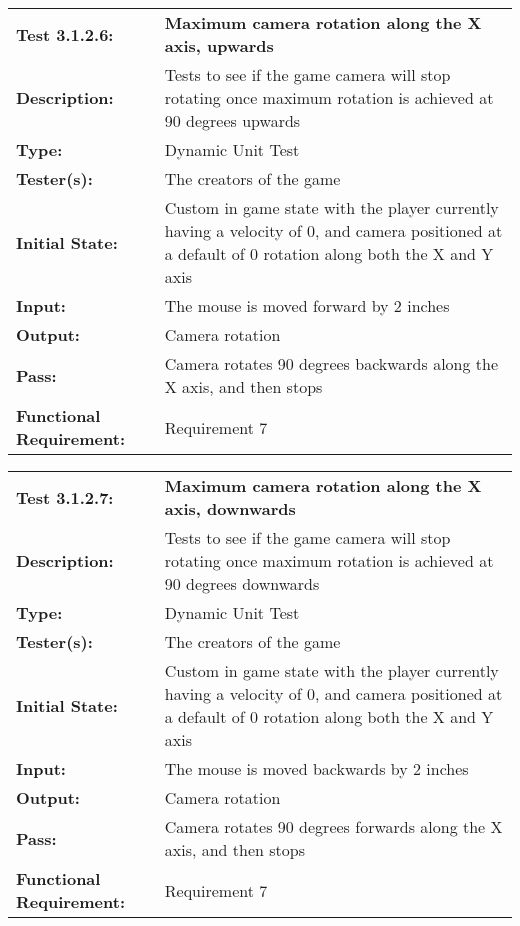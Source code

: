 \documentclass[12pt, titlepage]{article}
\begin{document}
\begin{mdframed}[linewidth=1pt]
\begin{tabularx}{\textwidth}{@{}p{3cm}X@{}}
{\bf Test 3.1.2.6:} & {\bf Maximum camera rotation along the X axis, upwards}\\[\baselineskip]
{\bf Description:} & Tests to see if the game camera will stop rotating once maximum rotation is achieved at 90 degrees upwards\\[0.5\baselineskip]
{\bf Type:} & Dynamic Unit Test\\[0.5\baselineskip]
{\bf Tester(s):} & The creators of the game\\[0.5\baselineskip]
{\bf Initial State:} & Custom in game state with the player currently having a velocity of 0, and camera positioned at a default of 0 rotation along both the X and Y axis\\[0.5\baselineskip]
{\bf Input:} & The mouse is moved forward by 2 inches\\[0.5\baselineskip]
{\bf Output:} & Camera rotation\\[0.5\baselineskip]
{\bf Pass:} & Camera rotates 90 degrees backwards along the X axis, and then stops \\[0.5\baselineskip]
{\bf Functional Requirement:} & Requirement 7
\end{tabularx}
\end{mdframed}

\begin{mdframed}[linewidth=1pt]
\begin{tabularx}{\textwidth}{@{}p{3cm}X@{}}
{\bf Test 3.1.2.7:} & {\bf Maximum camera rotation along the X axis, downwards}\\[\baselineskip]
{\bf Description:} & Tests to see if the game camera will stop rotating once maximum rotation is achieved at 90 degrees downwards\\[0.5\baselineskip]
{\bf Type:} & Dynamic Unit Test\\[0.5\baselineskip]
{\bf Tester(s):} & The creators of the game\\[0.5\baselineskip]
{\bf Initial State:} & Custom in game state with the player currently having a velocity of 0, and camera positioned at a default of 0 rotation along both the X and Y axis\\[0.5\baselineskip]
{\bf Input:} & The mouse is moved backwards by 2 inches\\[0.5\baselineskip]
{\bf Output:} & Camera rotation\\[0.5\baselineskip]
{\bf Pass:} & Camera rotates 90 degrees forwards along the X axis, and then stops \\[0.5\baselineskip]
{\bf Functional Requirement:} & Requirement 7
\end{tabularx}
\end{mdframed}
\end{document}
